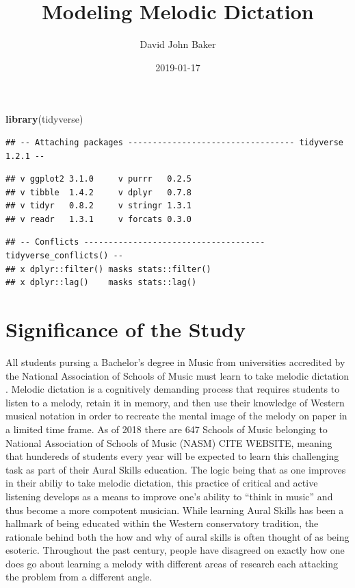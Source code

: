 \documentclass[]{book}
\title{Modeling Melodic Dictation}
\author{David John Baker}
\date{2019-01-17}
\newenvironment{Shaded}{\begin{snugshade}}{\end{snugshade}}
\newcommand{\KeywordTok}[1]{\textcolor[rgb]{0.13,0.29,0.53}{\textbf{#1}}}
\newcommand{\NormalTok}[1]{#1}
\begin{document}
\maketitle

{
\setcounter{tocdepth}{1}
\tableofcontents
}
\begin{Shaded}
\begin{Highlighting}[]
\KeywordTok{library}\NormalTok{(tidyverse)}
\end{Highlighting}
\end{Shaded}

\begin{verbatim}
## -- Attaching packages ---------------------------------- tidyverse 1.2.1 --
\end{verbatim}

\begin{verbatim}
## v ggplot2 3.1.0     v purrr   0.2.5
## v tibble  1.4.2     v dplyr   0.7.8
## v tidyr   0.8.2     v stringr 1.3.1
## v readr   1.3.1     v forcats 0.3.0
\end{verbatim}

\begin{verbatim}
## -- Conflicts ------------------------------------- tidyverse_conflicts() --
## x dplyr::filter() masks stats::filter()
## x dplyr::lag()    masks stats::lag()
\end{verbatim}

\hypertarget{significance-of-the-study}{%
\chapter{Significance of the Study}\label{significance-of-the-study}}

All students pursing a Bachelor's degree in Music from universities accredited by the National Association of Schools of Music must learn to take melodic dictation \citep[ Section VIII.6.B.2.A]{NationalAssociationSchools2018}.
Melodic dictation is a cognitively demanding process that requires students to listen to a melody, retain it in memory, and then use their knowledge of Western musical notation in order to recreate the mental image of the melody on paper in a limited time frame.
As of 2018 there are 647 Schools of Music belonging to National Association of Schools of Music (NASM) CITE WEBSITE, meaning that hundereds of students every year will be expected to learn this challenging task as part of their Aural Skills education.
The logic being that as one improves in their abiliy to take melodic dictation, this practice of critical and active listening develops as a means to improve one's ability to ``think in music'' and thus become a more compotent musician.
While learning Aural Skills has been a hallmark of being educated within the Western conservatory tradition, the rationale behind both the how and why of aural skills is often thought of as being esoteric.
Throughout the past century, people have disagreed on exactly how one does go about learning a melody with different areas of research each attacking the problem from a different angle.
\end{document}
